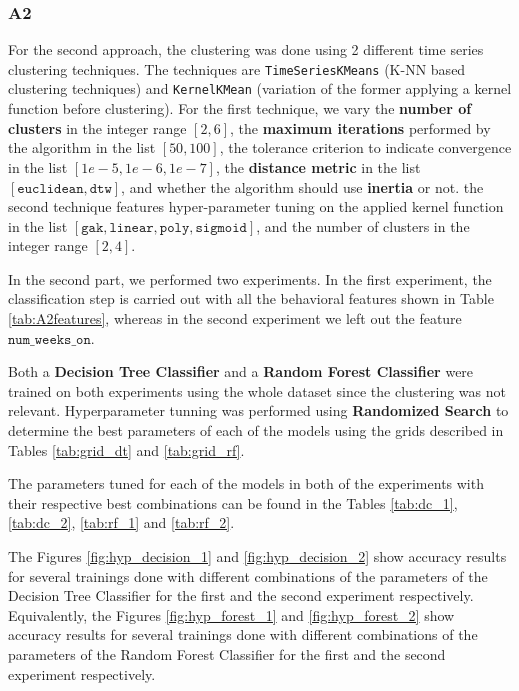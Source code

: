 \documentclass[sigplan,screen]{acmart}
\begin{document}
\subsubsection{A2}
For the second approach, the clustering was done using 2 different time series clustering techniques. The techniques are \texttt{TimeSeriesKMeans} (K-NN based clustering techniques) and \texttt{KernelKMean} (variation of the former applying a kernel function before clustering). For the first technique, we vary the \textbf{number of clusters} in the integer range $[2, 6]$, the \textbf{maximum iterations} performed by the algorithm in the list $[50, 100]$, the tolerance criterion to indicate convergence in the list $[1e-5, 1e-6, 1e-7]$, the \textbf{distance metric} in the list $[\texttt{euclidean}, \texttt{dtw}]$, and whether the algorithm should use \textbf{inertia} or not. the second technique features hyper-parameter tuning on the applied kernel function in the list $[\texttt{gak}, \texttt{linear}, \texttt{poly}, \texttt{sigmoid}]$, and the number of clusters in the integer range $[2, 4]$.

In the second part, we performed two experiments. In the first experiment, the classification step is carried out with all the behavioral features shown in Table \ref{tab:A2features}, whereas in the second experiment we left out the feature $\texttt{num\_weeks\_on}$.

Both a \textbf{Decision Tree Classifier} and a \textbf{Random Forest Classifier} were trained on both experiments using the whole dataset since the clustering was not relevant. Hyperparameter tunning was performed using \textbf{Randomized Search} to determine the best parameters of each of the models using the grids described in Tables \ref{tab:grid_dt} and \ref{tab:grid_rf}.

The parameters tuned for each of the models in both of the experiments with their respective best combinations can be found in the Tables \ref{tab:dc_1}, \ref{tab:dc_2}, \ref{tab:rf_1} and \ref{tab:rf_2}.

The Figures \ref{fig:hyp_decision_1} and \ref{fig:hyp_decision_2} show accuracy results for several trainings done with different combinations of the parameters of the Decision Tree Classifier for the first and the second experiment respectively. Equivalently, the Figures \ref{fig:hyp_forest_1} and \ref{fig:hyp_forest_2} show accuracy results for several trainings done with different combinations of the parameters of the Random Forest Classifier for the first and the second experiment respectively.
\end{document}
